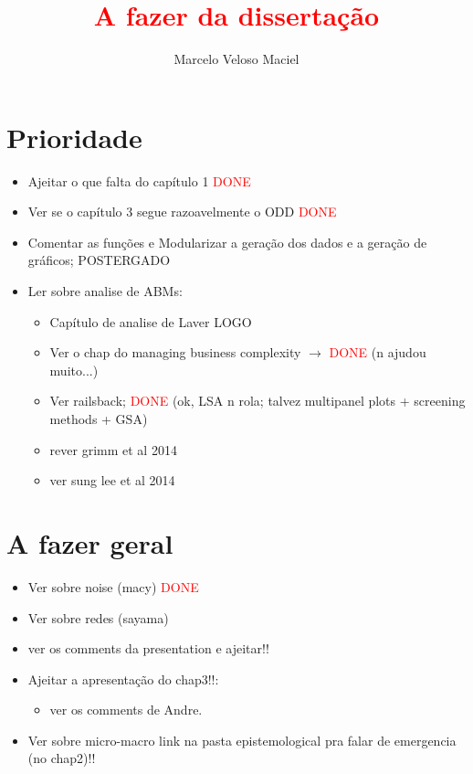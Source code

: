 \documentclass{article}
\title{\textcolor{red}{A fazer da dissertação}}
\author{Marcelo Veloso Maciel}
\date{}
\begin{document}
\pagecolor{base03}
\color{base1}

\maketitle


\section*{Prioridade}
\begin{itemize}
\item Ajeitar o que falta do capítulo 1 \textcolor{red}{DONE}
\item Ver se o capítulo 3 segue razoavelmente o ODD \textcolor{red}{DONE}
\item Comentar as funções e Modularizar a geração dos dados e a geração de
  gráficos; POSTERGADO
  
\item Ler sobre analise de ABMs:
  \begin{itemize}
  \item Capítulo de analise de Laver LOGO 
  \item Ver o chap do managing business complexity \(\rightarrow\) \textcolor{red}{DONE}
    (n ajudou muito...)
  \item Ver railsback; \textcolor{red}{DONE} (ok, LSA n rola; talvez multipanel
    plots + screening methods + GSA)
  \item rever grimm et al 2014
  \item ver sung lee et al 2014
  \end{itemize}
\end{itemize}

\section*{A fazer geral}
\begin{itemize}
  \item Ver sobre noise (macy) \textcolor{red}{DONE}
  \item Ver sobre redes (sayama)
  \item ver os comments da presentation e ajeitar!!
  \item Ajeitar a apresentação do chap3!!:
    \begin{itemize}
    \item ver os comments de Andre.
    \end{itemize}
    \item Ver sobre micro-macro link na pasta epistemological pra falar de
      emergencia (no chap2)!!
\end{itemize}
\end{document}

